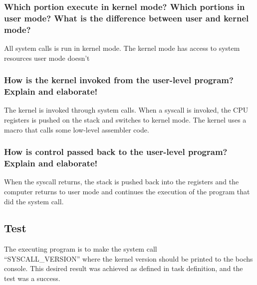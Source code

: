 
\subsubsection*{Which portion execute in kernel mode? Which portions in user mode? What is the difference between user and kernel mode?}
All system calls is run in kernel mode. The kernel mode has access to system resources user mode doesn't

\subsubsection*{How is the kernel invoked from the user-level program? Explain and elaborate!}
The kernel is invoked through system calls. When a syscall is invoked, the CPU registers is pushed on the stack and switches to kernel mode. The kernel uses a macro that calls some low-level assembler code.

\subsubsection*{How is control passed back to the user-level program? Explain and elaborate!}

When the syscall returns, the stack is pushed back into the registers and the computer returns to user mode and continues the execution of the
program that did the system call.

\subsection{Test}
The executing program is to make the system call\\ “SYSCALL\_VERSION” where the kernel version should be printed to the bochs console. This desired result was achieved as defined in task definition, and the test was a success.